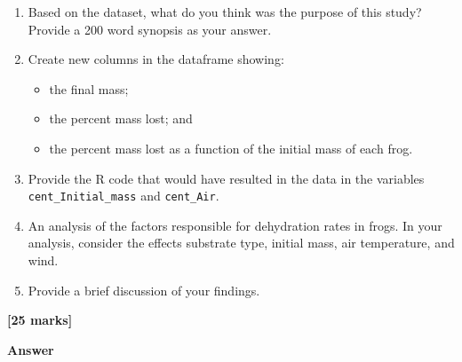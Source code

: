 \documentclass[
  10t,
]{article}
\providecommand{\tightlist}{%
  \setlength{\itemsep}{0pt}\setlength{\parskip}{0pt}}
\let\oldtexttt\texttt
\renewcommand{\texttt}[1]{\oldtexttt{\small #1}}
\begin{document}
\begin{enumerate}
\def\labelenumi{\alph{enumi}.}
\tightlist
\item
  Based on the dataset, what do you think was the purpose of this study?
  Provide a 200 word synopsis as your answer.
\item
  Create new columns in the dataframe showing:

  \begin{itemize}
  \tightlist
  \item
    the final mass;
  \item
    the percent mass lost; and
  \item
    the percent mass lost as a function of the initial mass of each
    frog.
  \end{itemize}
\item
  Provide the R code that would have resulted in the data in the
  variables \texttt{cent\_Initial\_mass} and \texttt{cent\_Air}.
\item
  An analysis of the factors responsible for dehydration rates in frogs.
  In your analysis, consider the effects substrate type, initial mass,
  air temperature, and wind.
\item
  Provide a brief discussion of your findings.
\end{enumerate}

\textbf{{[}25 marks{]}}

\textbf{Answer}
\end{document}
